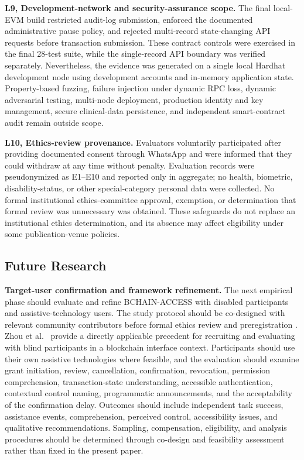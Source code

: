 \documentclass[journal]{IEEEtran}
\begin{document}
\noindent\textbf{L9, Development-network and security-assurance scope.}
The final local-EVM build restricted audit-log submission, enforced the documented administrative pause policy, and rejected multi-record state-changing API requests before transaction submission. These contract controls were exercised in the final 28-test suite, while the single-record API boundary was verified separately. Nevertheless, the evidence was generated on a single local Hardhat development node using development accounts and in-memory application state. Property-based fuzzing, failure injection under dynamic RPC loss, dynamic adversarial testing, multi-node deployment, production identity and key management, secure clinical-data persistence, and independent smart-contract audit remain outside scope.

\noindent\textbf{L10, Ethics-review provenance.}
Evaluators voluntarily participated after providing documented consent through WhatsApp and were informed that they could withdraw at any time without penalty. Evaluation records were pseudonymized as E1--E10 and reported only in aggregate; no health, biometric, disability-status, or other special-category personal data were collected. No formal institutional ethics-committee approval, exemption, or determination that formal review was unnecessary was obtained. These safeguards do not replace an institutional ethics determination, and its absence may affect eligibility under some publication-venue policies.

\subsection{Future Research}
\label{sec:future-work}

\noindent\textbf{Target-user confirmation and framework refinement.}
The next empirical phase should evaluate and refine BCHAIN-ACCESS with disabled participants and assistive-technology users. The study protocol should be co-designed with relevant community contributors before formal ethics review and preregistration \cite{nosek2018preregistration}. Zhou et al.~\cite{zhou2023accessible} provide a directly applicable precedent for recruiting and evaluating with blind participants in a blockchain interface context. Participants should use their own assistive technologies where feasible, and the evaluation should examine grant initiation, review, cancellation, confirmation, revocation, permission comprehension, transaction-state understanding, accessible authentication, contextual control naming, programmatic announcements, and the acceptability of the confirmation delay. Outcomes should include independent task success, assistance events, comprehension, perceived control, accessibility issues, and qualitative recommendations. Sampling, compensation, eligibility, and analysis procedures should be determined through co-design and feasibility assessment rather than fixed in the present paper.
\end{document}
